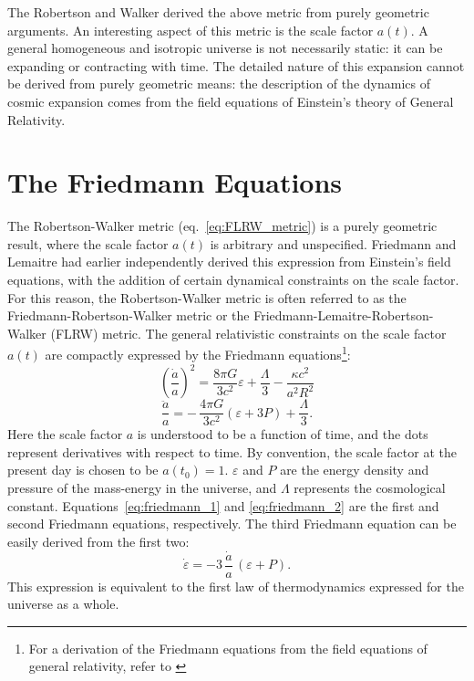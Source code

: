 The Robertson and Walker derived the above metric
from purely geometric arguments.
An interesting aspect of this metric is the scale factor $a(t)$.  A general
homogeneous and isotropic universe is not necessarily static: it can be
expanding or contracting with time.  The detailed nature of this expansion
cannot be derived from purely geometric means: the description of the dynamics
of cosmic expansion comes from the field equations of Einstein's theory
of General Relativity.

\section{The Friedmann Equations}
\label{sec:friedmann}
The Robertson-Walker metric (eq.~\ref{eq:FLRW_metric})
is a purely geometric result,
where the scale factor $a(t)$ is arbitrary and unspecified.
Friedmann and Lemaitre had earlier independently derived this expression
from Einstein's field equations, with the addition of certain dynamical
constraints on the scale factor.  For this reason, the Robertson-Walker
metric is often referred to as the Friedmann-Robertson-Walker metric
or the Friedmann-Lemaitre-Robertson-Walker (FLRW) metric.
The general relativistic constraints on the scale factor $a(t)$
are compactly expressed by the Friedmann
equations\footnote{For a  derivation of the Friedmann
  equations from the field equations of general relativity,
  refer to \citet{peebles1993principles}}:
\begin{equation}
  \label{eq:friedmann_1}
  \left(\frac{\dot{a}}{a}\right)^2
  = \frac{8\pi G}{3c^2}\varepsilon
  + \frac{\Lambda}{3} - \frac{\kappa c^2}{a^2 R^2}
\end{equation}
\begin{equation}
  \label{eq:friedmann_2}
  \frac{\ddot{a}}{a}
  = -\,\frac{4\pi G}{3c^2}(\varepsilon + 3P) + \frac{\Lambda}{3}.
\end{equation}
Here the scale factor $a$ is understood to be a function of time, and the
dots represent derivatives with respect to time.
By convention, the scale factor at the present day is
chosen to be $a(t_0) = 1$.  $\varepsilon$ and $P$ are
the energy density and pressure of the mass-energy in the universe, and
$\Lambda$ represents the cosmological constant.
Equations~\ref{eq:friedmann_1} and \ref{eq:friedmann_2} are the first and
second Friedmann equations, respectively.  The third Friedmann equation
can be easily derived from the first two:
\begin{equation}
  \label{eq:friedmann_3}
  \dot{\varepsilon} = -3\,\frac{\dot{a}}{a}\,(\varepsilon + P).
\end{equation}
This expression is equivalent to the first law of thermodynamics
expressed for the universe as a whole.

